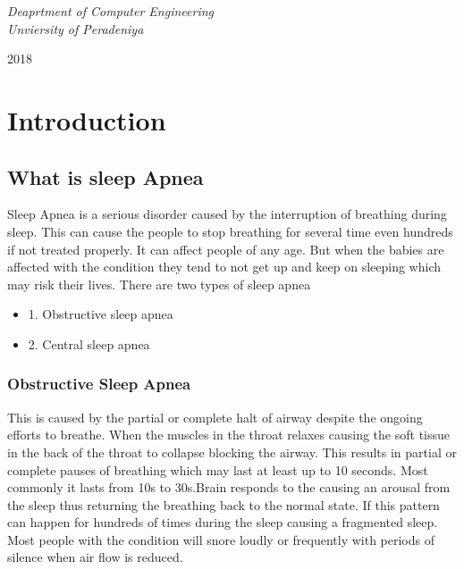 \documentclass{report}
\begin{document}
\begin{titlepage}
	\vspace{0.5\baselineskip} %
	
	\textit{Deaprtment of Computer Engineering \\ Unviersity of Peradeniya} %
	
	\vfill %
	
	
	
	\vspace{0.3\baselineskip} %
	
	2018 %
	
\end{titlepage}


\clearpage


\tableofcontents
\clearpage

\listoffigures
\listoftables
\clearpage


\chapter{Introduction}


\section{What is sleep Apnea}

Sleep Apnea is a serious disorder caused by the interruption of breathing during sleep. This can cause the people to stop breathing for several time even hundreds if not treated properly. It can affect people of any age. But when the babies are affected with the condition they tend to not get up and keep on sleeping which may risk their lives. There are two types of sleep apnea 

\begin{itemize}
    

    \item 1. Obstructive sleep apnea
    \item 2. Central sleep apnea

\end{itemize}    
\subsection{Obstructive Sleep Apnea}

    This is caused by the partial or complete halt of airway  despite the ongoing efforts to breathe. When the muscles in the throat relaxes causing the soft tissue in the back of the throat to collapse blocking the airway. This results in partial or complete pauses of breathing which may last at least up to 10 seconds. Most commonly  it lasts from 10s to 30s.Brain responds to the causing an arousal from the sleep thus returning the breathing back to the normal state. If this pattern can happen for hundreds of times during the sleep causing a fragmented sleep. Most people with the condition will snore loudly or frequently with periods of silence when air flow is reduced.\\ 
    
\end{document}
